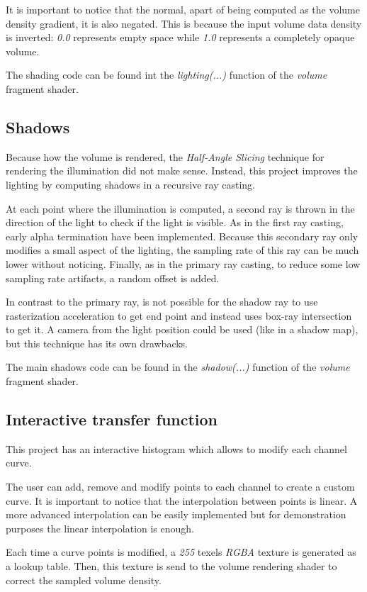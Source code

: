 \documentclass{article}
\begin{document}
It is important to notice that the normal, apart of being computed as the volume density gradient, it is also negated. This is because the input volume data density is inverted: \textit{0.0} represents empty space while \textit{1.0} represents a completely opaque volume.

The shading code can be found int the \textit{lighting(...)} function of the \textit{volume} fragment shader.

\subsection*{Shadows}
Because how the volume is rendered, the \textit{Half-Angle Slicing} technique for rendering the illumination did not make sense. Instead, this project improves the lighting by computing shadows in a recursive ray casting.

At each point where the illumination is computed, a second ray is thrown in the direction of the light to check if the light is visible. As in the first ray casting, early alpha termination have been implemented. Because this secondary ray only modifies a small aspect of the lighting, the sampling rate of this ray can be much lower without noticing. Finally, as in the primary ray casting, to reduce some low sampling rate artifacts, a random offset is added.

In contrast to the primary ray, is not possible for the shadow ray to use rasterization acceleration to get end point and instead uses box-ray intersection to get it. A camera from the light position could be used (like in a shadow map), but this technique has its own drawbacks.

The main shadows code can be found in the \textit{shadow(...)} function of the \textit{volume} fragment shader.

\subsection*{Interactive transfer function}
This project has an interactive histogram which allows to modify each channel curve.

The user can add, remove and modify points to each channel to create a custom curve. It is important to notice that the interpolation between points is linear. A more advanced interpolation can be easily implemented but for demonstration purposes the linear interpolation is enough.

Each time a curve points is modified, a \textit{255} texels \textit{RGBA} texture is generated as a lookup table. Then, this texture is send to the volume rendering shader to correct the sampled volume density.
\end{document}
